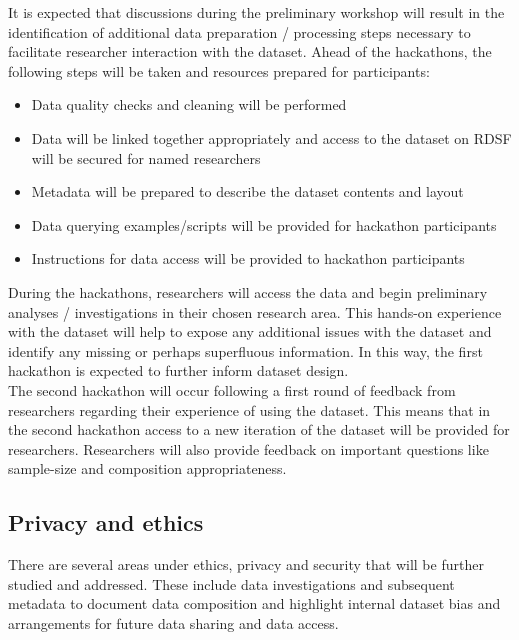 \documentclass{article}
\begin{document}
It is expected that discussions during the preliminary workshop will
result in the identification of additional data preparation /
processing steps necessary to facilitate researcher interaction with
the dataset. Ahead of the hackathons, the following steps will be
taken and resources
prepared for participants:

\begin{itemize}
\item Data quality checks and cleaning will be performed
\item Data will be linked together appropriately and access to the
  dataset on RDSF will be secured for named researchers
\item Metadata will be prepared to describe the dataset contents and layout
\item Data querying examples/scripts will be provided for hackathon participants
\item Instructions for data access will be provided to hackathon participants
\end{itemize}

During the hackathons, researchers will access the data and begin
preliminary analyses / investigations in their chosen research
area. This hands-on experience with the dataset will help to expose
any additional issues with the dataset and identify any missing or
perhaps superfluous information. In this way, the first hackathon is
expected to further inform dataset design. \\

The second hackathon will occur following a first round of feedback
from researchers regarding their experience of using the dataset. This
means that in the second hackathon access to a new iteration of the
dataset will be provided for researchers. Researchers will also
provide feedback on important questions like sample-size and
composition appropriateness. 

\subsection{Privacy and ethics}

There are several areas under ethics, privacy and security that will
be further studied and addressed. These include data investigations
and subsequent metadata to document data composition and highlight
internal dataset bias and arrangements for future data sharing and data access.
\end{document}
